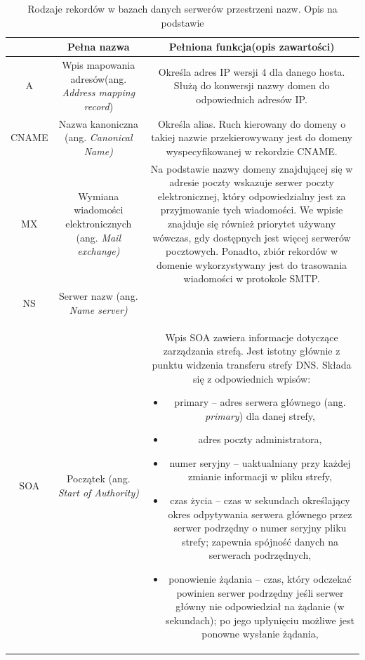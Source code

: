 \begin{longtable}{ccc}
	\caption{Rodzaje rekordów w bazach danych serwerów przestrzeni nazw. Opis na podstawie \cite{RFC1035}}\\
	\label{typyRekordowDns}
	\begin{tabular}{|r|p{3cm}|p{8cm}|}
		\toprule
			\textbf{Rekord} &
			\textbf{Pełna nazwa} &
			\textbf{Pełniona funkcja(opis zawartości)} \\
		\midrule
			A &
			Wpis mapowania adresów(ang. \textit{Address mapping record}) &
			Określa adres IP wersji 4 dla danego hosta. Służą do konwersji nazwy domen do odpowiednich adresów IP.\\
		\hline
			CNAME &
			Nazwa kanoniczna (ang. \textit{Canonical Name)} &
			Określa alias. Ruch kierowany do domeny o takiej nazwie przekierowywany jest do domeny wyspecyfikowanej
			w rekordzie CNAME.
			\\
		\hline
			MX &
			Wymiana wiadomości elektronicznych (ang. \textit{Mail exchange)} &
			Na podstawie nazwy domeny znajdującej się w adresie poczty wskazuje serwer poczty elektronicznej, który odpowiedzialny jest
			za przyjmowanie tych wiadomości. We wpisie znajduje się również priorytet używany wówczas, gdy dostępnych jest więcej serwerów
			pocztowych. Ponadto, zbiór rekordów w domenie wykorzystywany jest do trasowania wiadomości w protokole SMTP.
			\\
		\hline
			NS &
			Serwer nazw (ang. \textit{Name server)} &
			\\
		\hline
			SOA &
			Początek (ang. \textit{Start of Authority)} &
			Wpis SOA zawiera informacje dotyczące zarządzania strefą. Jest istotny głównie z punktu widzenia transferu strefy DNS.
			Składa się z odpowiednich wpisów:
			\begin{itemize}
				\item primary -- adres serwera głównego (ang. \textit{primary}) dla danej strefy,
				\item adres poczty administratora,
				\item numer seryjny -- uaktualniany przy każdej zmianie informacji w pliku strefy,
				\item czas życia -- czas w sekundach określający okres odpytywania serwera głównego przez serwer podrzędny o numer seryjny pliku strefy; zapewnia spójność danych na serwerach podrzędnych,
				\item ponowienie żądania -- czas, który odczekać powinien serwer podrzędny jeśli serwer główny nie odpowiedział na żądanie (w sekundach); po jego upłynięciu możliwe jest ponowne wysłanie żądania,

\end{itemize}
\end{tabular}
\end{longtable}
